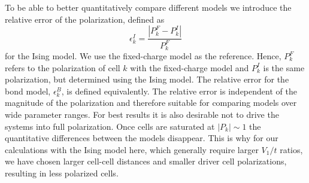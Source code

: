 To be able to better quantitatively compare different models we introduce the
relative error of the polarization, defined as
%
\begin{equation}
  \epsilon^I_k = \frac{\left|P^F_k - P^I_k\right|}{P^F_k}
\end{equation}
%
for the Ising model. We use the fixed-charge model as the reference. Hence,
$P^F_k$ refers to the polarization of cell $k$ with the fixed-charge
model and $P^I_k$ is the same polarization, but determined using the Ising
model. The relative error for the bond model, $\epsilon^B_k$, is defined
equivalently. The relative error is independent of the magnitude of the
polarization and therefore suitable for comparing models over wide parameter
ranges. For best results it is also desirable not to drive the systems
into full polarization. Once cells are saturated at $\left| P_k \right| \sim 1$
the quantitative differences between the models disappear. This is why for our
calculations with the Ising model here, which generally require larger $V_1/t$
ratios, we have chosen larger cell-cell distances and smaller driver cell
polarizations, resulting in less polarized cells.

